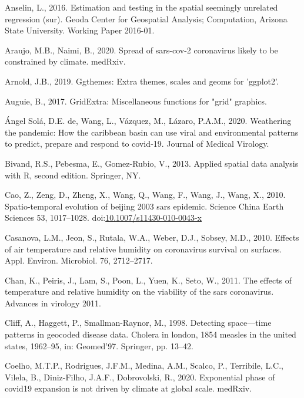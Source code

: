 \documentclass[]{elsarticle} %
\begin{document}
\leavevmode\hypertarget{ref-Anselin2016estimation}{}%
Anselin, L., 2016. Estimation and testing in the spatial seemingly
unrelated regression (sur). Geoda Center for Geospatial Analysis;
Computation, Arizona State University. Working Paper 2016-01.

\leavevmode\hypertarget{ref-Araujo2020spread}{}%
Araujo, M.B., Naimi, B., 2020. Spread of sars-cov-2 coronavirus likely
to be constrained by climate. medRxiv.

\leavevmode\hypertarget{ref-Arnold2019}{}%
Arnold, J.B., 2019. Ggthemes: Extra themes, scales and geoms for
'ggplot2'.

\leavevmode\hypertarget{ref-Auguie2017gridextra}{}%
Auguie, B., 2017. GridExtra: Miscellaneous functions for "grid"
graphics.

\leavevmode\hypertarget{ref-deangel2020weathering}{}%
Ángel Solá, D.E. de, Wang, L., Vázquez, M., Lázaro, P.A.M., 2020.
Weathering the pandemic: How the caribbean basin can use viral and
environmental patterns to predict, prepare and respond to covid‐19.
Journal of Medical Virology.

\leavevmode\hypertarget{ref-Bivand2013}{}%
Bivand, R.S., Pebesma, E., Gomez-Rubio, V., 2013. Applied spatial data
analysis with R, second edition. Springer, NY.

\leavevmode\hypertarget{ref-Cao2010spatio}{}%
Cao, Z., Zeng, D., Zheng, X., Wang, Q., Wang, F., Wang, J., Wang, X.,
2010. Spatio-temporal evolution of beijing 2003 sars epidemic. Science
China Earth Sciences 53, 1017--1028.
doi:\href{https://doi.org/10.1007/s11430-010-0043-x}{10.1007/s11430-010-0043-x}

\leavevmode\hypertarget{ref-Casanova2010effects}{}%
Casanova, L.M., Jeon, S., Rutala, W.A., Weber, D.J., Sobsey, M.D., 2010.
Effects of air temperature and relative humidity on coronavirus survival
on surfaces. Appl. Environ. Microbiol. 76, 2712--2717.

\leavevmode\hypertarget{ref-Chan2011effects}{}%
Chan, K., Peiris, J., Lam, S., Poon, L., Yuen, K., Seto, W., 2011. The
effects of temperature and relative humidity on the viability of the
sars coronavirus. Advances in virology 2011.

\leavevmode\hypertarget{ref-Cliff1998detecting}{}%
Cliff, A., Haggett, P., Smallman-Raynor, M., 1998. Detecting
space---time patterns in geocoded disease data. Cholera in london, 1854
measles in the united states, 1962--95, in: Geomed'97. Springer, pp.
13--42.

\leavevmode\hypertarget{ref-Coelho2020exponential}{}%
Coelho, M.T.P., Rodrigues, J.F.M., Medina, A.M., Scalco, P., Terribile,
L.C., Vilela, B., Diniz-Filho, J.A.F., Dobrovolski, R., 2020.
Exponential phase of covid19 expansion is not driven by climate at
global scale. medRxiv.
\end{document}
